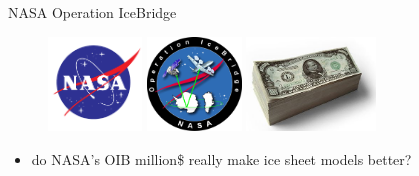\documentclass[hide notes,intlimits]{beamer}
\begin{document}
\begin{frame}{NASA Operation IceBridge}
  \begin{figure}
    \includegraphics[height=2.5cm]{nasa-logo} \qquad
    \includegraphics[height=2.5cm]{oib} \qquad
    \includegraphics[height=2.5cm]{1000-dollar-bills}
  \end{figure}
  \begin{itemize}
  \item do NASA's OIB million\$ really make ice sheet models better?
  \end{itemize}
\end{frame}
\end{document}
